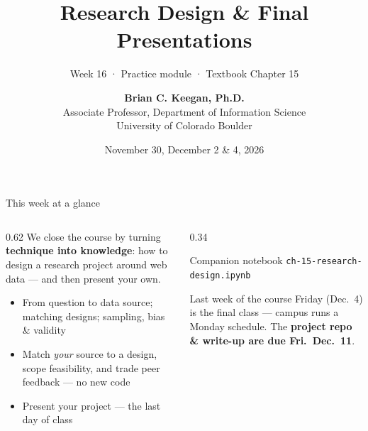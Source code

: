 \documentclass[9pt,aspectratio=169]{beamer}
\title[Week 16 · Research Design]{{\Huge Research Design \& Final Presentations}}
\subtitle{Week 16 · Practice module · Textbook Chapter 15}
\author[Keegan]{\textbf{Brian C. Keegan, Ph.D.} \\ Associate Professor, Department of Information Science \\ University of Colorado Boulder}
\date{November 30, December 2 \& 4, 2026}
\begin{document}
\maketitle

\begin{frame}{This week at a glance}
    \begin{columns}[T]
        \begin{column}{0.62\textwidth}
            We close the course by turning \textbf{technique into knowledge}: how to design a research project around web data --- and then present your own.

            \vspace{1em}

            \begin{itemize}\small
                \item From question to data source; matching designs; sampling, bias \& validity
            \end{itemize}

            \vspace{0.5em}

            \begin{itemize}\small
                \item Match \textit{your} source to a design, scope feasibility, and trade peer feedback --- no new code
            \end{itemize}

            \vspace{0.5em}

            \begin{itemize}\small
                \item Present your project --- the last day of class
            \end{itemize}
        \end{column}
        \begin{column}{0.34\textwidth}
            \begin{block}{Companion notebook}
                \footnotesize \texttt{ch-15-research-design.ipynb}
            \end{block}
            \begin{alertblock}{Last week of the course}
                \footnotesize Friday (Dec.~4) is the final class --- campus runs a Monday schedule. The \textbf{project repo \& write-up are due Fri.\ Dec.~11}.
            \end{alertblock}
        \end{column}
    \end{columns}
\end{frame}
\end{document}
